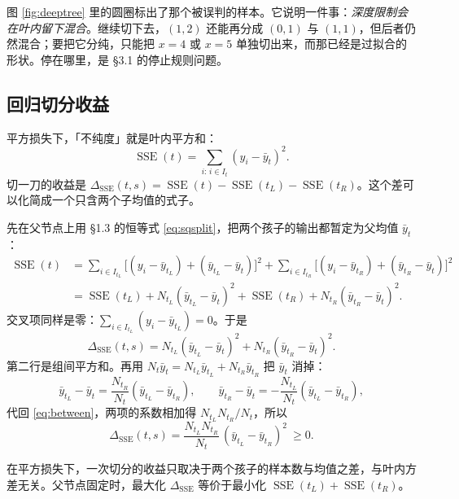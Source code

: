 \documentclass[11pt,a4paper,fontset=windows,zihao=-4]{ctexart}
\DeclareMathOperator{\SSE}{SSE}
\begin{document}
图 \ref{fig:deeptree} 里的圆圈标出了那个被误判的样本。它说明一件事：\emph{深度限制会在叶内留下混合}。继续切下去，$(1,2)$ 还能再分成 $(0,1)$ 与 $(1,1)$，但后者仍然混合；要把它分纯，只能把 $x=4$ 或 $x=5$ 单独切出来，而那已经是过拟合的形状。停在哪里，是 §3.1 的停止规则问题。

\subsection{回归切分收益}

平方损失下，「不纯度」就是叶内平方和：
\begin{equation}
  \SSE(t)=\sum_{i:\,i\in I_t}(y_i-\bar y_t)^2 .
  \label{eq:sse}
\end{equation}
切一刀的收益是 $\Delta_{\SSE}(t,s)=\SSE(t)-\SSE(t_L)-\SSE(t_R)$。这个差可以化简成一个只含两个子均值的式子。

先在父节点上用 §1.3 的恒等式 \eqref{eq:sqsplit}，把两个孩子的输出都暂定为父均值 $\bar y_t$：
\[
\begin{aligned}
\SSE(t)
&=\sum_{i\in I_{t_L}}\bigl[(y_i-\bar y_{t_L})+(\bar y_{t_L}-\bar y_t)\bigr]^2
 +\sum_{i\in I_{t_R}}\bigl[(y_i-\bar y_{t_R})+(\bar y_{t_R}-\bar y_t)\bigr]^2\\
&=\SSE(t_L)+N_{t_L}(\bar y_{t_L}-\bar y_t)^2
 +\SSE(t_R)+N_{t_R}(\bar y_{t_R}-\bar y_t)^2 .
\end{aligned}
\]
交叉项同样是零：$\sum_{i\in I_{t_L}}(y_i-\bar y_{t_L})=0$。于是
\begin{equation}
  \Delta_{\SSE}(t,s)
  =N_{t_L}(\bar y_{t_L}-\bar y_t)^2+N_{t_R}(\bar y_{t_R}-\bar y_t)^2 .
  \label{eq:between}
\end{equation}
第二行是组间平方和。再用 $N_t\bar y_t=N_{t_L}\bar y_{t_L}+N_{t_R}\bar y_{t_R}$ 把 $\bar y_t$ 消掉：
\[
  \bar y_{t_L}-\bar y_t=\frac{N_{t_R}}{N_t}(\bar y_{t_L}-\bar y_{t_R}),
  \qquad
  \bar y_{t_R}-\bar y_t=-\frac{N_{t_L}}{N_t}(\bar y_{t_L}-\bar y_{t_R}),
\]
代回 \eqref{eq:between}，两项的系数相加得 $N_{t_L}N_{t_R}/N_t$，所以
\begin{equation}
  \Delta_{\SSE}(t,s)
  =\frac{N_{t_L}N_{t_R}}{N_t}\,(\bar y_{t_L}-\bar y_{t_R})^2\ \ge 0 .
  \label{eq:ssgain}
\end{equation}

\begin{prop}[回归切分收益]
在平方损失下，一次切分的收益只取决于两个孩子的样本数与均值之差，与叶内方差无关。父节点固定时，最大化 $\Delta_{\SSE}$ 等价于最小化 $\SSE(t_L)+\SSE(t_R)$。
\end{prop}
\end{document}
